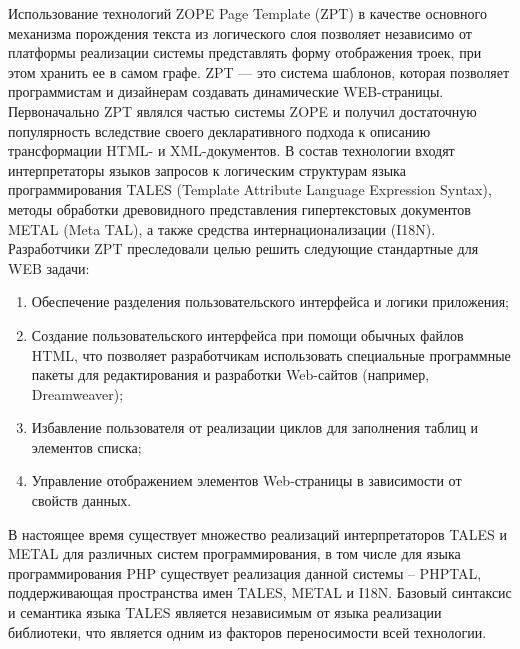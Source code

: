 \documentclass[utf8]{../IncArticle}
\begin{document}

Использование технологий ZOPE Page Template (ZPT) в качестве основного
механизма порождения текста из логического слоя позволяет независимо
от платформы реализации системы представлять форму отображения троек,
при этом хранить ее в самом графе.  ZPT --- это система шаблонов,
которая позволяет программистам и дизайнерам создавать динамические
WEB-страницы.  Первоначально ZPT являлся частью системы ZOPE и получил
достаточную популярность вследствие своего декларативного подхода к
описанию трансформации HTML- и XML-документов.  В состав технологии
входят интерпретаторы языков запросов к логическим структурам языка
программирования TALES (Template Attribute Language Expression
Syntax), методы обработки древовидного представления гипертекстовых
документов METAL (Meta TAL), а также средства интернационализации
(I18N).  Разработчики ZPT преследовали целью решить следующие
стандартные для WEB задачи:
\begin{enumerate}
\item Обеспечение разделения пользовательского интерфейса и логики
  приложения;
\item Создание пользовательского интерфейса при помощи обычных файлов
  HTML, что позволяет разработчикам использовать специальные
  программные пакеты для редактирования и разработки Web-сайтов
  (например, Dreamweaver);
\item Избавление пользователя от реализации циклов для заполнения
  таблиц и элементов списка;
\item Управление отображением элементов Web-страницы в зависимости от
  свойств данных.
\end{enumerate}

В настоящее время существует множество реализаций интерпретаторов
TALES и METAL для различных систем программирования, в том числе для
языка программирования PHP существует реализация данной системы –
PHPTAL, поддерживающая пространства имен TALES, METAL и I18N.  Базовый
синтаксис и семантика языка TALES является независимым от языка
реализации библиотеки, что является одним из факторов переносимости
всей технологии.
\end{document}
